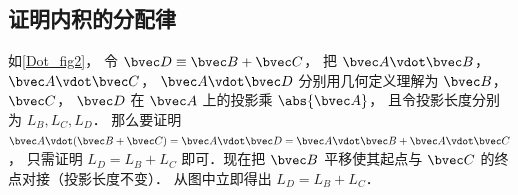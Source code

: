 \subsection{证明内积的分配律}

如\autoref{Dot_fig2}， 令 $\bvec D \equiv \bvec B + \bvec C$， 把 $\bvec A \vdot \bvec B$，  $\bvec A \vdot \bvec C$，  $\bvec A \vdot \bvec D$ 分别用几何定义理解为 $\bvec B$，  $\bvec C$，  $\bvec D$ 在 $\bvec A$ 上的投影乘 $\abs{\bvec A}$， 且令投影长度分别为 $L_B, L_C, L_D$． 那么要证明 $\bvec A \vdot (\bvec B + \bvec C) = \bvec A \vdot \bvec D = \bvec A \vdot \bvec B + \bvec A \vdot \bvec C$， 只需证明 $L_D = L_B + L_C$ 即可．现在把 $\bvec B$ 平移使其起点与 $\bvec C$ 的终点对接（投影长度不变）． 从图中立即得出 $L_D = L_B + L_C$．  








